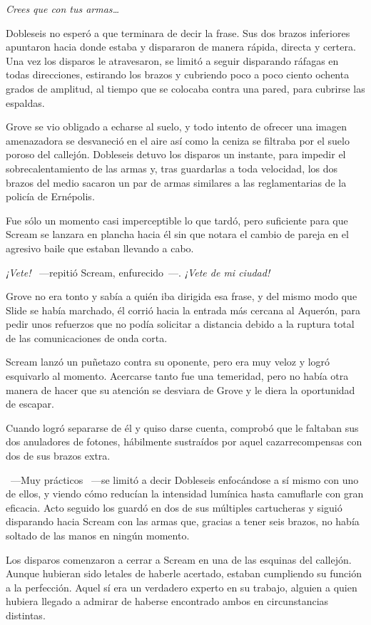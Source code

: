 \emph{Crees que con tus armas\dots}

Dobleseis no esperó a que terminara de decir la frase. Sus dos brazos inferiores apuntaron hacia donde estaba y dispararon de manera rápida, directa y certera. Una vez los disparos le atravesaron, se limitó a seguir disparando ráfagas en todas direcciones, estirando los brazos y cubriendo poco a poco ciento ochenta grados de amplitud, al tiempo que se colocaba contra una pared, para cubrirse las espaldas.

Grove se vio obligado a echarse al suelo, y todo intento de ofrecer una imagen amenazadora se desvaneció en el aire así como la ceniza se filtraba por el suelo poroso del callejón. Dobleseis detuvo los disparos un instante, para impedir el sobrecalentamiento de las armas y, tras guardarlas a toda velocidad, los dos brazos del medio sacaron un par de armas similares a las reglamentarias de la policía de Ernépolis.

Fue sólo un momento casi imperceptible lo que tardó, pero suficiente para que Scream se lanzara en plancha hacia él sin que notara el cambio de pareja en el agresivo baile que estaban llevando a cabo.

\emph{¡Vete!} ~---repitió Scream, enfurecido~---. \emph{¡Vete de mi ciudad!}

Grove no era tonto y sabía a quién iba dirigida esa frase, y del mismo modo que Slide se había marchado, él corrió hacia la entrada más cercana al Aquerón, para pedir unos refuerzos que no podía solicitar a distancia debido a la ruptura total de las comunicaciones de onda corta.

Scream lanzó un puñetazo contra su oponente, pero era muy veloz y logró esquivarlo al momento. Acercarse tanto fue una temeridad, pero no había otra manera de hacer que su atención se desviara de Grove y le diera la oportunidad de escapar.

Cuando logró separarse de él y quiso darse cuenta, comprobó que le faltaban sus dos anuladores de fotones, hábilmente sustraídos por aquel cazarrecompensas con dos de sus brazos extra.

~---Muy prácticos ~---se limitó a decir Dobleseis enfocándose a sí mismo con uno de ellos, y viendo cómo reducían la intensidad lumínica hasta camuflarle con gran eficacia. Acto seguido los guardó en dos de sus múltiples cartucheras y siguió disparando hacia Scream con las armas que, gracias a tener seis brazos, no había soltado de las manos en ningún momento.

Los disparos comenzaron a cerrar a Scream en una de las esquinas del callejón. Aunque hubieran sido letales de haberle acertado, estaban cumpliendo su función a la perfección. Aquel sí era un verdadero experto en su trabajo, alguien a quien hubiera llegado a admirar de haberse encontrado ambos en circunstancias distintas.

